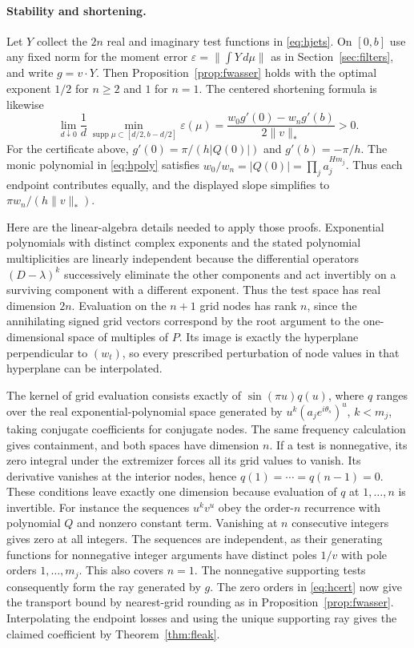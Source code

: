 \documentclass[11pt,letterpaper]{article}
\theoremstyle{remark}\newtheorem{remark}[theorem]{Remark}
\begin{document}
\paragraph{Stability and shortening.}
Let $Y$ collect the $2n$ real and imaginary test functions in \eqref{eq:hjets}. On $[0,b]$ use any fixed norm for the moment error $\varepsilon=\|\int Y\,d\mu\|$ as in Section~\ref{sec:filters}, and write $g=v\cdot Y$. Then Proposition~\ref{prop:fwasser} holds with the optimal exponent $1/2$ for $n\ge2$ and $1$ for $n=1$. The centered shortening formula is likewise
\[
 \lim_{d\downarrow0}\frac{1}{d}\min_{\operatorname{supp}\mu\subset[d/2,b-d/2]}\varepsilon(\mu)
 =\frac{w_0g'(0)-w_ng'(b)}{2\|v\|_*}>0.
\]
For the certificate above, $g'(0)=\pi/(h|Q(0)|)$ and $g'(b)=-\pi/h$. The monic polynomial in \eqref{eq:hpoly} satisfies $w_0/w_n=|Q(0)|=\prod_j a_j^{Hm_j}$. Thus each endpoint contributes equally, and the displayed slope simplifies to $\pi w_n/(h\|v\|_*)$.

Here are the linear-algebra details needed to apply those proofs. Exponential polynomials with distinct complex exponents and the stated polynomial multiplicities are linearly independent because the differential operators $(D-\lambda)^k$ successively eliminate the other components and act invertibly on a surviving component with a different exponent. Thus the test space has real dimension $2n$. Evaluation on the $n+1$ grid nodes has rank $n$, since the annihilating signed grid vectors correspond by the root argument to the one-dimensional space of multiples of $P$. Its image is exactly the hyperplane perpendicular to $(w_t)$, so every prescribed perturbation of node values in that hyperplane can be interpolated.

The kernel of grid evaluation consists exactly of $\sin(\pi u)q(u)$, where $q$ ranges over the real exponential-polynomial space generated by $u^k(a_je^{i\theta_s})^u$, $k<m_j$, taking conjugate coefficients for conjugate nodes. The same frequency calculation gives containment, and both spaces have dimension $n$. If a test is nonnegative, its zero integral under the extremizer forces all its grid values to vanish. Its derivative vanishes at the interior nodes, hence $q(1)=\cdots=q(n-1)=0$. These conditions leave exactly one dimension because evaluation of $q$ at $1,\ldots,n$ is invertible. For instance the sequences $u^kv^u$ obey the order-$n$ recurrence with polynomial $Q$ and nonzero constant term. Vanishing at $n$ consecutive integers gives zero at all integers. The sequences are independent, as their generating functions for nonnegative integer arguments have distinct poles $1/v$ with pole orders $1,\ldots,m_j$. This also covers $n=1$. The nonnegative supporting tests consequently form the ray generated by $g$. The zero orders in \eqref{eq:hcert} now give the transport bound by nearest-grid rounding as in Proposition~\ref{prop:fwasser}. Interpolating the endpoint losses and using the unique supporting ray gives the claimed coefficient by Theorem~\ref{thm:fleak}.
\end{document}
